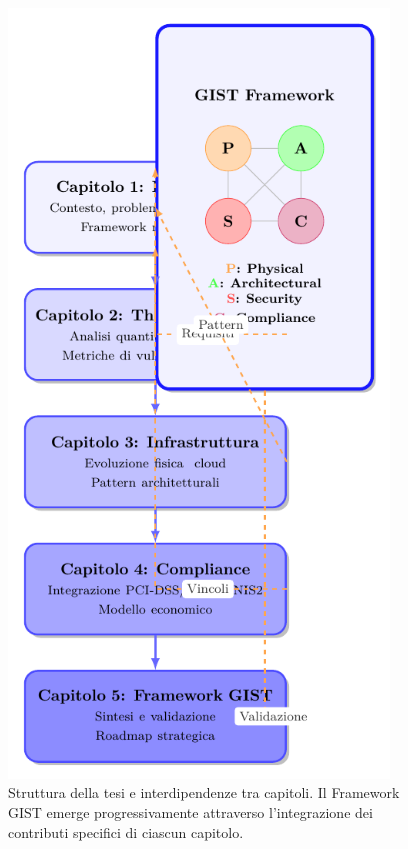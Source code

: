 \documentclass{report}
\begin{document}
\begin{figure}[htbp]
    \centering
    \includegraphics[width=0.9\textwidth]{figura 1-4}
\caption{Struttura della tesi e interdipendenze tra capitoli. Il Framework GIST emerge progressivamente attraverso l'integrazione dei contributi specifici di ciascun capitolo.}
\label{fig:struttura_tesi}
\end{figure}
\end{document}
